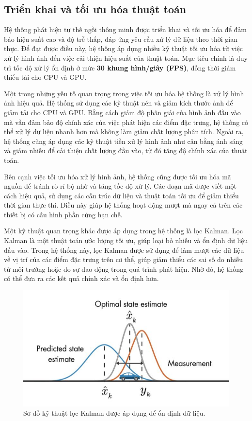\documentclass[conference]{IEEEtran}
\begin{document}
\subsection{Triển khai và tối ưu hóa thuật toán}
Hệ thống phát hiện tư thế ngồi thông minh được triển khai và tối ưu hóa để đảm bảo hiệu suất cao và độ trễ thấp, đáp ứng yêu cầu xử lý dữ liệu theo thời gian thực. Để đạt được điều này, hệ thống áp dụng nhiều kỹ thuật tối ưu hóa từ việc xử lý hình ảnh đến việc cải thiện hiệu suất của thuật toán. Mục tiêu chính là duy trì tốc độ xử lý ổn định ở mức \textbf{30 khung hình/giây (FPS)}, đồng thời giảm thiểu tải cho CPU và GPU.

Một trong những yếu tố quan trọng trong việc tối ưu hóa hệ thống là xử lý hình ảnh hiệu quả. Hệ thống sử dụng các kỹ thuật nén và giảm kích thước ảnh để giảm tải cho CPU và GPU. Bằng cách giảm độ phân giải của hình ảnh đầu vào mà vẫn đảm bảo độ chính xác của việc phát hiện các điểm đặc trưng, hệ thống có thể xử lý dữ liệu nhanh hơn mà không làm giảm chất lượng phân tích. Ngoài ra, hệ thống cũng áp dụng các kỹ thuật tiền xử lý hình ảnh như cân bằng ánh sáng và giảm nhiễu để cải thiện chất lượng đầu vào, từ đó tăng độ chính xác của thuật toán.

Bên cạnh việc tối ưu hóa xử lý hình ảnh, hệ thống cũng được tối ưu hóa mã nguồn để tránh rò rỉ bộ nhớ và tăng tốc độ xử lý. Các đoạn mã được viết một cách hiệu quả, sử dụng các cấu trúc dữ liệu và thuật toán tối ưu để giảm thiểu thời gian thực thi. Điều này giúp hệ thống hoạt động mượt mà ngay cả trên các thiết bị có cấu hình phần cứng hạn chế.

Một kỹ thuật quan trọng khác được áp dụng trong hệ thống là lọc Kalman. Lọc Kalman là một thuật toán ước lượng tối ưu, giúp loại bỏ nhiễu và ổn định dữ liệu đầu vào. Trong hệ thống này, lọc Kalman được sử dụng để làm mượt các dữ liệu về vị trí của các điểm đặc trưng trên cơ thể, giúp giảm thiểu các sai số do nhiễu từ môi trường hoặc do sự dao động trong quá trình phát hiện. Nhờ đó, hệ thống có thể đưa ra các kết quả chính xác và ổn định hơn.

\begin{figure}[H]
    \centering
    \includegraphics[width=0.9\linewidth]{images/kalman_filter.png}
    \caption{Sơ đồ kỹ thuật lọc Kalman được áp dụng để ổn định dữ liệu.}
    \label{fig:kalman_filter}
\end{figure}
\end{document}
